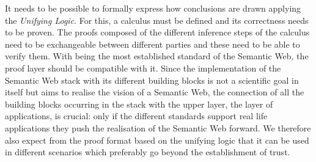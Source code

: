 %
%
%
It needs to be possible to formally express how conclusions are drawn applying the \emph{Unifying Logic}.
For this, a calculus must be defined and its correctness needs to be proven. The proofs composed of the different inference steps of the calculus need to be exchangeable between 
different parties and these need to be able to verify them. With \rdf being the most established standard of the Semantic Web, the proof layer should be compatible with it. 
Since the implementation of the
Semantic Web stack with its different building blocks is not a scientific goal in itself but aims to realise the vision of a Semantic Web, the connection of all the building blocks 
occurring in the stack with the upper layer, the layer of applications, is crucial: only if the different standards support real life applications they push the realisation of the
Semantic Web forward. We therefore also expect from the proof format based on the unifying logic that it can be used in different scenarios which preferably go beyond the establishment of trust. 

